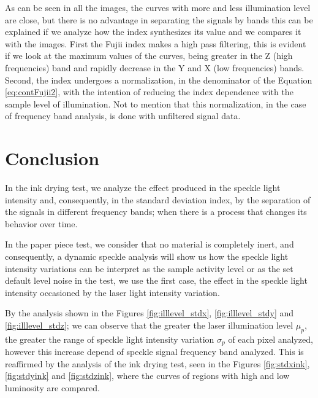 \documentclass[review]{elsarticle}
\begin{document}
As can be seen in all the images, the curves with more and less  illumination level are close,
but there is no advantage in separating the signals by bands
this can be explained if we analyze how the index synthesizes its value and we compares it with the images.
First the Fujii index makes a high pass filtering,
this is evident if we look at the maximum values of the curves,
being greater in the Z (high frequencies) band and rapidly decrease in the Y and X (low frequencies) bands.
Second, the index undergoes a normalization, in the denominator of the Equation \ref{eq:contFujii2},
with the intention of reducing the index dependence with the sample level of illumination.
Not to mention that this normalization, in the case of frequency band analysis, is done with unfiltered signal data.

\section{Conclusion} 

In the ink drying test, 
we analyze the effect produced in  the speckle light intensity and, consequently, in the standard deviation index, 
by the separation of the signals in different frequency bands;
when there is a process that changes its behavior over time.

In the paper piece test, we consider that no material is completely inert, 
and consequently, 
a dynamic speckle analysis will show us how the speckle light intensity variations can be interpret as the sample activity level or as the set default level noise in the test,
we use the first case,
the effect in the speckle light intensity occasioned by the laser light intensity variation.


By the analysis shown in the Figures \ref{fig:illlevel_stdx}, \ref{fig:illlevel_stdy} and \ref{fig:illlevel_stdz};
we can observe that the greater the laser illumination level $\mu_p$, 
the greater the range of speckle light intensity variation $\sigma_p$ of each pixel analyzed, 
however this increase depend of speckle signal frequency band analyzed.
This is reaffirmed by the analysis of the ink drying test, 
seen in the Figures \ref{fig:stdxink}, \ref{fig:stdyink} and \ref{fig:stdzink},
where the curves of regions with high and low luminosity are compared.
\end{document}
